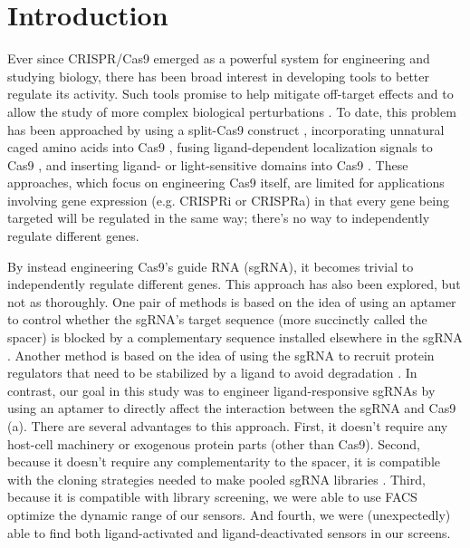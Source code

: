 \documentclass[10pt,oneside]{article}
\begin{document}
\section{Introduction}


Ever since CRISPR/Cas9 emerged as a powerful system for engineering and studying biology, there has been broad interest in developing tools to better regulate its activity.  Such tools promise to help mitigate off-target effects and to allow the study of more complex biological perturbations \autocite{richter2017}.  To date, this problem has been approached by using a split-Cas9 construct \autocite{zetsche2015,nguyen2016,nihongaki2015}, incorporating unnatural caged amino acids into Cas9 \autocite{hemphill2015,luo2016}, fusing ligand-dependent localization signals to Cas9 \autocite{liuramli2016}, and inserting ligand- or light-sensitive domains into Cas9 \autocite{oakes2016,richter2016}.  These approaches, which focus on engineering Cas9 itself, are limited for applications involving gene expression (e.g. CRISPRi or CRISPRa) in that every gene being targeted will be regulated in the same way; there's no way to independently regulate different genes.


% 
% 
% 
%
By instead engineering Cas9's guide RNA (sgRNA), it becomes trivial to independently regulate different genes.  This approach has also been explored, but not as thoroughly.  One pair of methods is based on the idea of using an aptamer to control whether the sgRNA's  target sequence (more succinctly called the spacer) is blocked by a complementary sequence installed elsewhere in the sgRNA \autocite{liu2016,tang2017}.  Another method is based on the idea of using the sgRNA to recruit protein regulators that need to be stabilized by a ligand to avoid degradation \autocite{maji2017}.  In contrast, our goal in this study was to engineer ligand-responsive sgRNAs by using an aptamer to directly affect the interaction between the sgRNA and Cas9 (a).  There are several advantages to this approach.  First, it doesn't require any host-cell machinery or exogenous protein parts (other than Cas9).  Second, because it doesn't require any complementarity to the spacer, it is compatible with the cloning strategies needed to make pooled sgRNA libraries \autocite{gilbert2014}.  Third, because it is compatible with library screening, we were able to use FACS optimize the dynamic range of our sensors.  And fourth, we were (unexpectedly) able to find both ligand-activated and ligand-deactivated sensors in our screens.
\end{document}
